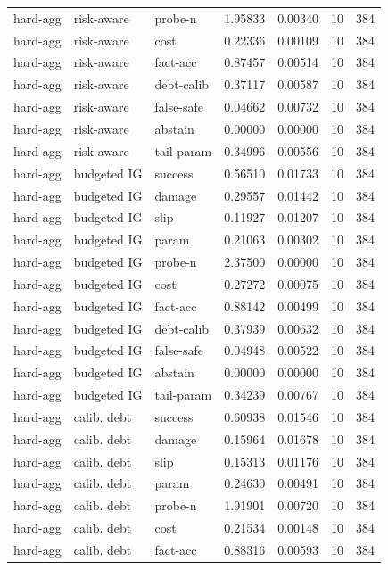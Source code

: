 \documentclass{article}
\begin{document}
\begin{center}
\begin{longtable}{lllllll}
hard-agg & risk-aware & probe-n & 1.95833 & 0.00340 & 10 & 384 \\
hard-agg & risk-aware & cost & 0.22336 & 0.00109 & 10 & 384 \\
hard-agg & risk-aware & fact-acc & 0.87457 & 0.00514 & 10 & 384 \\
hard-agg & risk-aware & debt-calib & 0.37117 & 0.00587 & 10 & 384 \\
hard-agg & risk-aware & false-safe & 0.04662 & 0.00732 & 10 & 384 \\
hard-agg & risk-aware & abstain & 0.00000 & 0.00000 & 10 & 384 \\
hard-agg & risk-aware & tail-param & 0.34996 & 0.00556 & 10 & 384 \\
hard-agg & budgeted IG & success & 0.56510 & 0.01733 & 10 & 384 \\
hard-agg & budgeted IG & damage & 0.29557 & 0.01442 & 10 & 384 \\
hard-agg & budgeted IG & slip & 0.11927 & 0.01207 & 10 & 384 \\
hard-agg & budgeted IG & param & 0.21063 & 0.00302 & 10 & 384 \\
hard-agg & budgeted IG & probe-n & 2.37500 & 0.00000 & 10 & 384 \\
hard-agg & budgeted IG & cost & 0.27272 & 0.00075 & 10 & 384 \\
hard-agg & budgeted IG & fact-acc & 0.88142 & 0.00499 & 10 & 384 \\
hard-agg & budgeted IG & debt-calib & 0.37939 & 0.00632 & 10 & 384 \\
hard-agg & budgeted IG & false-safe & 0.04948 & 0.00522 & 10 & 384 \\
hard-agg & budgeted IG & abstain & 0.00000 & 0.00000 & 10 & 384 \\
hard-agg & budgeted IG & tail-param & 0.34239 & 0.00767 & 10 & 384 \\
hard-agg & calib. debt & success & 0.60938 & 0.01546 & 10 & 384 \\
hard-agg & calib. debt & damage & 0.15964 & 0.01678 & 10 & 384 \\
hard-agg & calib. debt & slip & 0.15313 & 0.01176 & 10 & 384 \\
hard-agg & calib. debt & param & 0.24630 & 0.00491 & 10 & 384 \\
hard-agg & calib. debt & probe-n & 1.91901 & 0.00720 & 10 & 384 \\
hard-agg & calib. debt & cost & 0.21534 & 0.00148 & 10 & 384 \\
hard-agg & calib. debt & fact-acc & 0.88316 & 0.00593 & 10 & 384 \\

\end{longtable}
\end{center}
\end{document}
